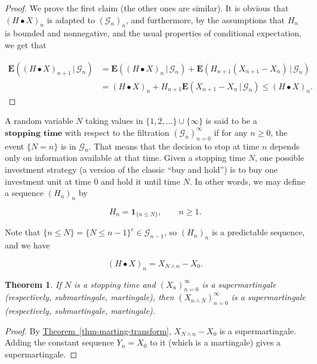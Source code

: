 \documentclass[11pt]{report}
\theoremstyle{plain}
\newtheorem{thm}{Theorem}[chapter]
\theoremstyle{definition}
\begin{document}
\begin{proof}
We prove the first claim (the other ones are
similar). It is obvious that $(H\bullet X)_n$ is
adapted to $(\mathcal{G}_n)_n$, and furthermore, by
the assumptions that $H_n$ is bounded and
nonnegative, and the usual properties of conditional
expectation, we get that

\begin{align*}
\mathbf{E}\left((H\bullet X)_{n+1}\,|\,\mathcal{G}_n\right) &=
\mathbf{E}\left((H\bullet X)_{n}\,|\,\mathcal{G}_n\right) +
\mathbf{E}\left(H_{n+1}(X_{n+1}-X_n)\,|\,\mathcal{G}_n\right) \\
&= (H\bullet X)_n +
H_{n+1} \mathbf{E}\left(X_{n+1}-X_n\,|\,\mathcal{G}_n\right) \le (H\bullet X)_n.
\end{align*}

\end{proof}

\noindent A random variable $N$ taking values in
$\{1,2,\ldots\}\cup \{\infty\}$ is said to be a
$\textbf{stopping time}$ with respect to the
filtration $(\mathcal{G}_n)_{n=0}^\infty$ if for any
$n\ge0$, the event $\{ N=n \}$ is in $\mathcal{G}_n$.
That means that the decision to stop at time $n$
depends only on information available at that time.
Given a stopping time $N$, one possible investment
strategy (a version of the classic ``buy and hold'')
is to buy one investment unit at time $0$ and hold it
until time $N$. In other words, we may define a
sequence $(H_n)_n$ by

\[
H_n = \mathbf{1}_{\{n\le N\}}, \qquad n\ge 1.
\]

\noindent Note that
$\{ n\le N\} = \{N\le n-1\}^\textrm{c} \in
\mathcal{G}_{n-1}$,
so $(H_n)_n$ is a predictable sequence, and we have

\[
(H\bullet X)_n = X_{N\wedge n} - X_0.
\]

\begin{thm}
\label{thm-stopping-mart}
If $N$ is a stopping time and $(X_n)_{n=0}^\infty$ is
a supermartingale (respectively, submartingale,
martingale), then $(X_{n\wedge N})_{n=0}^\infty$ is a
supermartingale (respectively, submartingale,
martingale).
\end{thm}

\begin{proof}
By \hyperref[thm-marting-transform]{Theorem~\ref*{thm-marting-transform}},
$X_{N\wedge n} - X_0$ is a supermartingale. Adding
the constant sequence $Y_n=X_0$ to it (which is a
martingale) gives a supermartingale.
\end{proof}
\end{document}

